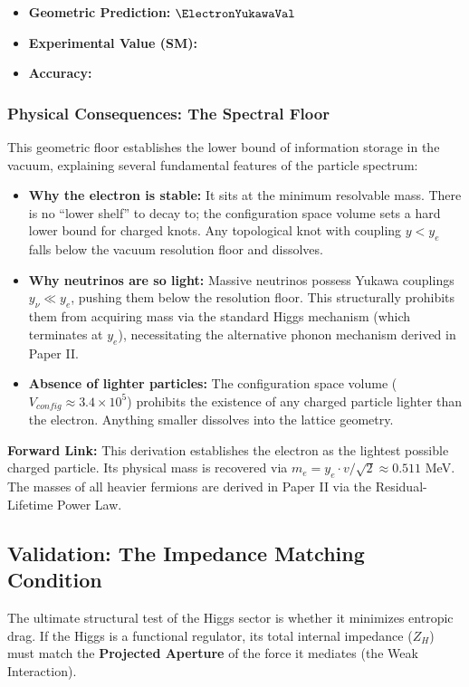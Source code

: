 \begin{itemize}
    \item \textbf{Geometric Prediction:} $\ElectronYukawaVal$
    \item \textbf{Experimental Value (SM):} \ElectronYukawaExperimentalValue
    \item \textbf{Accuracy:} \ElectronYukawaAccText
\end{itemize}

\subsubsection{Physical Consequences: The Spectral Floor}

This geometric floor establishes the lower bound of information storage in the vacuum, explaining several fundamental features of the particle spectrum:

\begin{itemize}
    \item \textbf{Why the electron is stable:} It sits at the minimum resolvable mass. There is no ``lower shelf'' to decay to; the configuration space volume sets a hard lower bound for charged knots. Any topological knot with coupling $y < y_e$ falls below the vacuum resolution floor and dissolves.
    \item \textbf{Why neutrinos are so light:} Massive neutrinos possess Yukawa couplings $y_\nu \ll y_e$, pushing them below the resolution floor. This structurally prohibits them from acquiring mass via the standard Higgs mechanism (which terminates at $y_e$), necessitating the alternative phonon mechanism derived in Paper II.
    \item \textbf{Absence of lighter particles:} The configuration space volume ($V_{config} \approx 3.4 \times 10^5$) prohibits the existence of any charged particle lighter than the electron. Anything smaller dissolves into the lattice geometry.
\end{itemize}

\textbf{Forward Link:} This derivation establishes the electron as the lightest possible charged particle. Its physical mass is recovered via $m_e = y_e \cdot v/\sqrt{2} \approx 0.511$ MeV. The masses of all heavier fermions are derived in Paper II via the Residual-Lifetime Power Law.

\subsection{Validation: The Impedance Matching Condition}
The ultimate structural test of the Higgs sector is whether it minimizes entropic drag. If the Higgs is a functional regulator, its total internal impedance ($Z_H$) must match the \textbf{Projected Aperture} of the force it mediates (the Weak Interaction).

